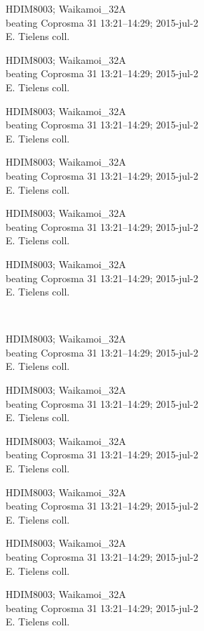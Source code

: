 \documentclass[2pt]{extarticle}
\begin{document}
\noindent
\parbox{0.16\textwidth}{\tiny \raggedright \rule[-0.3\baselineskip]{0pt}{10pt}HDIM8003; Waikamoi\_32A\\ beating Coprosma 31 13:21--14:29; 2015-jul-2\\ E. Tielens coll.}
\parbox{0.16\textwidth}{\tiny \raggedright \rule[-0.3\baselineskip]{0pt}{10pt}HDIM8003; Waikamoi\_32A\\ beating Coprosma 31 13:21--14:29; 2015-jul-2\\ E. Tielens coll.}
\parbox{0.16\textwidth}{\tiny \raggedright \rule[-0.3\baselineskip]{0pt}{10pt}HDIM8003; Waikamoi\_32A\\ beating Coprosma 31 13:21--14:29; 2015-jul-2\\ E. Tielens coll.}
\parbox{0.16\textwidth}{\tiny \raggedright \rule[-0.3\baselineskip]{0pt}{10pt}HDIM8003; Waikamoi\_32A\\ beating Coprosma 31 13:21--14:29; 2015-jul-2\\ E. Tielens coll.}
\parbox{0.16\textwidth}{\tiny \raggedright \rule[-0.3\baselineskip]{0pt}{10pt}HDIM8003; Waikamoi\_32A\\ beating Coprosma 31 13:21--14:29; 2015-jul-2\\ E. Tielens coll.}
\parbox{0.16\textwidth}{\tiny \raggedright \rule[-0.3\baselineskip]{0pt}{10pt}HDIM8003; Waikamoi\_32A\\ beating Coprosma 31 13:21--14:29; 2015-jul-2\\ E. Tielens coll.} \\ 
\vspace{0.001in} 

\noindent
\parbox{0.16\textwidth}{\tiny \raggedright \rule[-0.3\baselineskip]{0pt}{10pt}HDIM8003; Waikamoi\_32A\\ beating Coprosma 31 13:21--14:29; 2015-jul-2\\ E. Tielens coll.}
\parbox{0.16\textwidth}{\tiny \raggedright \rule[-0.3\baselineskip]{0pt}{10pt}HDIM8003; Waikamoi\_32A\\ beating Coprosma 31 13:21--14:29; 2015-jul-2\\ E. Tielens coll.}
\parbox{0.16\textwidth}{\tiny \raggedright \rule[-0.3\baselineskip]{0pt}{10pt}HDIM8003; Waikamoi\_32A\\ beating Coprosma 31 13:21--14:29; 2015-jul-2\\ E. Tielens coll.}
\parbox{0.16\textwidth}{\tiny \raggedright \rule[-0.3\baselineskip]{0pt}{10pt}HDIM8003; Waikamoi\_32A\\ beating Coprosma 31 13:21--14:29; 2015-jul-2\\ E. Tielens coll.}
\parbox{0.16\textwidth}{\tiny \raggedright \rule[-0.3\baselineskip]{0pt}{10pt}HDIM8003; Waikamoi\_32A\\ beating Coprosma 31 13:21--14:29; 2015-jul-2\\ E. Tielens coll.}
\parbox{0.16\textwidth}{\tiny \raggedright \rule[-0.3\baselineskip]{0pt}{10pt}HDIM8003; Waikamoi\_32A\\ beating Coprosma 31 13:21--14:29; 2015-jul-2\\ E. Tielens coll.} \\ 
\vspace{0.001in} 
\end{document}
